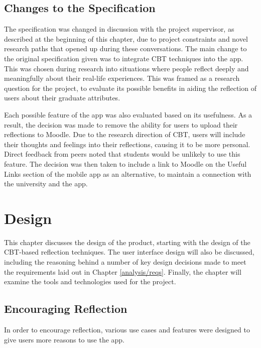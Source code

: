 \documentclass{l4proj}
\begin{document}
\section{Changes to the Specification}

The specification was changed in discussion with the project supervisor, as described at the beginning of this chapter, due to project constraints and novel research paths that opened up during these conversations. The main change to the original specification given was to integrate CBT techniques into the app. This was chosen during research into situations where people reflect deeply and meaningfully about their real-life experiences. This was framed as a research question for the project, to evaluate its possible benefits in aiding the reflection of users about their graduate attributes. 

Each possible feature of the app was also evaluated based on its usefulness. As a result, the decision was made to remove the ability for users to upload their reflections to Moodle. Due to the research direction of CBT, users will include their thoughts and feelings into their reflections, causing it to be more personal. Direct feedback from peers noted that students would be unlikely to use this feature. The decision was then taken to include a link to Moodle on the Useful Links section of the mobile app as an alternative, to maintain a connection with the university and the app.


\chapter{Design}

This chapter discusses the design of the product, starting with the design of the CBT-based reflection techniques. The user interface design will also be discussed, including the reasoning behind a number of key design decisions made to meet the requirements laid out in Chapter \ref{analysis/reqs}. Finally, the chapter will examine the tools and technologies used for the project. 

\section{Encouraging Reflection}

In order to encourage reflection, various use cases and features were designed to give users more reasons to use the app.
\end{document}
